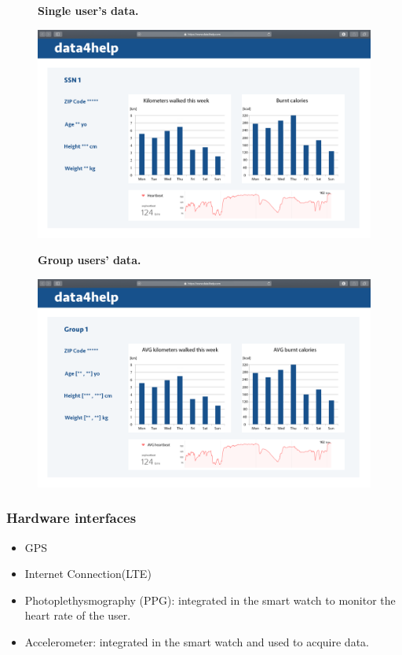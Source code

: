 \documentclass{article}
\begin{document}
\begin{figure}[h!]
\centering
    \textbf{Single user's data.}\par\medskip
	\includegraphics[width= \linewidth]{6userprofile.png}
\end{figure}\newpage
\begin{figure}[h!]
\centering
    \textbf{Group users' data.}\par\medskip
	\includegraphics[width= \linewidth]{7groupprofile.png}
\end{figure}\newpage
\subsubsection{Hardware interfaces}
\begin{itemize}
	\item GPS
	\item Internet Connection(LTE)
	\item Photoplethysmography (PPG): integrated in the smart watch to monitor the heart rate of the user.
	\item Accelerometer: integrated in the smart watch and used to acquire data.
\end{itemize}
\end{document}
